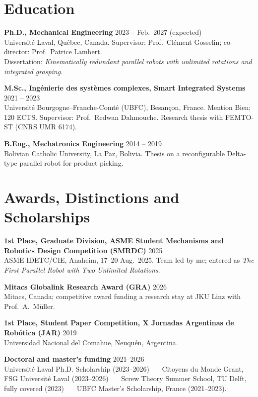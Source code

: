 \documentclass[11pt,letterpaper]{article}
\newenvironment{items}{\begin{list}{}{%
  \setlength{\leftmargin}{1.4em}\setlength{\itemindent}{-0.4em}
  \setlength{\itemsep}{0.5pt}\setlength{\parsep}{0pt}\setlength{\topsep}{1pt}}}%
  {\end{list}}
\newcommand{\dateline}[1]{\hfill{\footnotesize\color{cap} #1}}
\begin{document}
\section{Education}
\begin{items}
\item[] \textbf{Ph.D., Mechanical Engineering} \dateline{2023 -- Feb.~2027 (expected)}\\
{\footnotesize Universit\'e Laval, Qu\'ebec, Canada. Supervisor: Prof.~Cl\'ement Gosselin; co-director: Prof.~Patrice Lambert.\\
Dissertation: \emph{Kinematically redundant parallel robots with unlimited rotations and integrated grasping.}}
\item[] \textbf{M.Sc., Ing\'enierie des syst\`emes complexes, Smart Integrated Systems} \dateline{2021 -- 2023}\\
{\footnotesize Universit\'e Bourgogne--Franche-Comt\'e (UBFC), Besan\c{c}on, France. Mention Bien; 120 ECTS.
Supervisor: Prof.~Redwan Dahmouche. Research thesis with FEMTO-ST (CNRS UMR 6174).}

\item[] \textbf{B.Eng., Mechatronics Engineering} \dateline{2014 -- 2019}\\
{\footnotesize Bolivian Catholic University, La Paz, Bolivia. Thesis on a reconfigurable Delta-type parallel robot for product picking.}
\end{items}

\section{Awards, Distinctions and Scholarships}
\begin{items}
\item[] \textbf{1st Place, Graduate Division, ASME Student Mechanisms and Robotics Design Competition (SMRDC)} \dateline{2025}\\
{\footnotesize ASME IDETC/CIE, Anaheim, 17--20 Aug.~2025. Team led by me; entered as \emph{The First Parallel Robot with Two Unlimited Rotations}.}
\item[] \textbf{Mitacs Globalink Research Award (GRA)} \dateline{2026}\\
{\footnotesize Mitacs, Canada; competitive award funding a research stay at JKU Linz with Prof.~A.~M\"uller.}
\item[] \textbf{1st Place, Student Paper Competition, X Jornadas Argentinas de Rob\'otica (JAR)} \dateline{2019}\\
{\footnotesize Universidad Nacional del Comahue, Neuqu\'en, Argentina.}
\item[] \textbf{Doctoral and master's funding} \dateline{2021--2026}\\
{\footnotesize Universit\'e Laval Ph.D. Scholarship (2023--2026) \ \textbullet\ \ Citoyens du Monde Grant, FSG
Universit\'e Laval (2023--2026) \ \textbullet\ \ Screw Theory Summer School, TU Delft, fully covered (2023)
\ \textbullet\ \ UBFC Master's Scholarship, France (2021--2023).}
\end{items}
\end{document}
